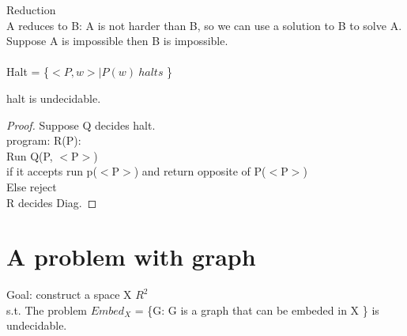 \documentclass{article}
\begin{document}
Reduction\\
A reduces to B: A is not harder than B, so we can use a solution to B to solve A.\\
Suppose A is impossible then B is impossible.\\\\


Halt = \{$<P, w>|P(w)\ halts$ \}
\begin{theorem}
halt is undecidable.
\end{theorem}
\begin{proof}
Suppose Q decides halt.\\
program: R(P):\\Run Q(P, $<$P$>$)\\if it accepts run p($<$P$>$) and return opposite of P($<$P$>$)\\Else reject\\
R decides Diag. \Rightarrow \perp
\end{proof}

\section{A problem with graph}
Goal: construct a space X \subseteq $R^2$ \\s.t. The problem $Embed_X$ = \{G: G is a graph that can be embeded in X \} is undecidable.
\end{document}

